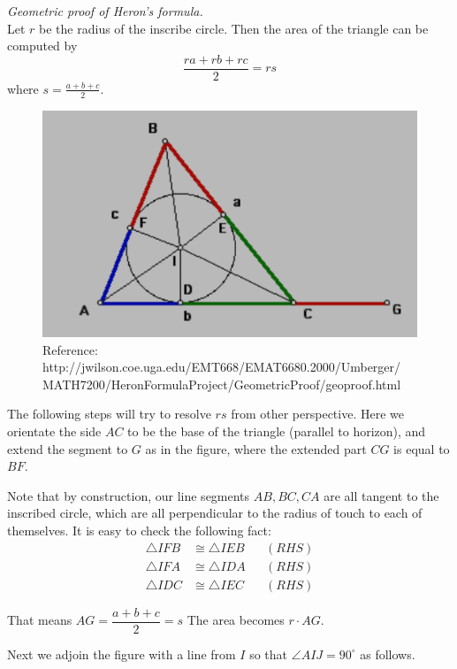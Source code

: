 \documentclass[12pt]{article}
\renewenvironment{proof}[1][Proof]{\begin{snugshade*} \textit{{#1}.}\\}{\hfill \qedsymbol \end{snugshade*}}
\begin{document}
    \begin{proof}[Geometric proof of Heron's formula]
        Let $r$ be the radius of the inscribe circle. Then the area of the triangle can be computed by $$\frac{ra+rb+rc}{2}=rs$$ where $s=\frac{a+b+c}{2}$. 

        \begin{figure}[H]
            \centering
            \includegraphics[scale=1.8]{heron.png}
            \caption{Reference: http://jwilson.coe.uga.edu/EMT668/EMAT6680.2000/Umberger/\\MATH7200/HeronFormulaProject/GeometricProof/geoproof.html}
        \end{figure}

        The following steps will try to resolve $rs$ from other perspective. Here we orientate the side $AC$ to be the base of the triangle (parallel to horizon), and extend the segment to $G$ as in the figure, where the extended part $CG$ is equal to $BF$.
        
        Note that by construction, our line segments $AB,BC,CA$ are all tangent to the inscribed circle, which are all perpendicular to the radius of touch to each of themselves. It is easy to check the following fact:\begin{align*}
            \triangle IFB &\cong \triangle IEB &&(RHS)\\
            \triangle IFA &\cong \triangle IDA &&(RHS)\\
            \triangle IDC &\cong \triangle IEC &&(RHS)
        \end{align*}
        
        That means $AG=\dfrac{a+b+c}{2}=s$ The area becomes $r\cdot AG$.

        Next we adjoin the figure with a line from $I$ so that $\angle AIJ = 90^\circ$ as follows.


\end{proof}
\end{document}
